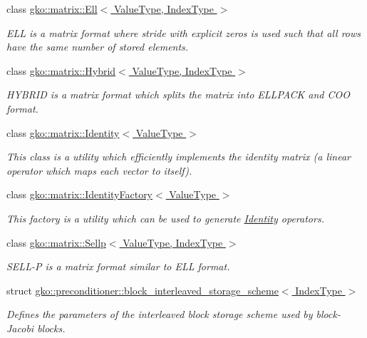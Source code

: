\begin{DoxyCompactItemize}
class \hyperlink{classgko_1_1matrix_1_1Ell}{gko\+::matrix\+::\+Ell$<$ Value\+Type, Index\+Type $>$}
\begin{DoxyCompactList}\small\item\em E\+LL is a matrix format where stride with explicit zeros is used such that all rows have the same number of stored elements. \end{DoxyCompactList}\item 
class \hyperlink{classgko_1_1matrix_1_1Hybrid}{gko\+::matrix\+::\+Hybrid$<$ Value\+Type, Index\+Type $>$}
\begin{DoxyCompactList}\small\item\em H\+Y\+B\+R\+ID is a matrix format which splits the matrix into E\+L\+L\+P\+A\+CK and C\+OO format. \end{DoxyCompactList}\item 
class \hyperlink{classgko_1_1matrix_1_1Identity}{gko\+::matrix\+::\+Identity$<$ Value\+Type $>$}
\begin{DoxyCompactList}\small\item\em This class is a utility which efficiently implements the identity matrix (a linear operator which maps each vector to itself). \end{DoxyCompactList}\item 
class \hyperlink{classgko_1_1matrix_1_1IdentityFactory}{gko\+::matrix\+::\+Identity\+Factory$<$ Value\+Type $>$}
\begin{DoxyCompactList}\small\item\em This factory is a utility which can be used to generate \hyperlink{classgko_1_1matrix_1_1Identity}{Identity} operators. \end{DoxyCompactList}\item 
class \hyperlink{classgko_1_1matrix_1_1Sellp}{gko\+::matrix\+::\+Sellp$<$ Value\+Type, Index\+Type $>$}
\begin{DoxyCompactList}\small\item\em S\+E\+L\+L-\/P is a matrix format similar to E\+LL format. \end{DoxyCompactList}\item 
struct \hyperlink{structgko_1_1preconditioner_1_1block__interleaved__storage__scheme}{gko\+::preconditioner\+::block\+\_\+interleaved\+\_\+storage\+\_\+scheme$<$ Index\+Type $>$}
\begin{DoxyCompactList}\small\item\em Defines the parameters of the interleaved block storage scheme used by block-\/\+Jacobi blocks. \end{DoxyCompactList}\item 

\end{DoxyCompactItemize}
